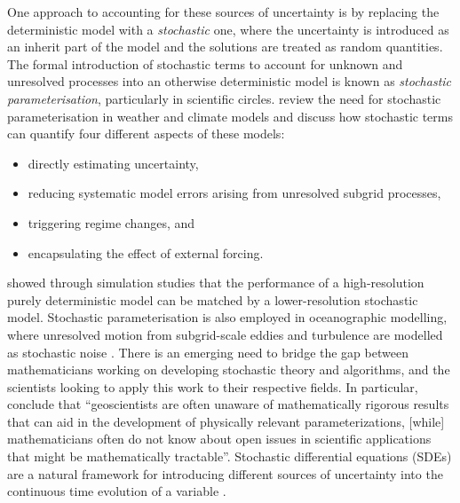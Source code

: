 One approach to accounting for these sources of uncertainty is by replacing the deterministic model with a \emph{stochastic} one, where the uncertainty is introduced as an inherit part of the model and the solutions are treated as random quantities.
The formal introduction of stochastic terms to account for unknown and unresolved processes into an otherwise deterministic model is known as \emph{stochastic parameterisation}, particularly in scientific circles.
\citet{BernerEtAl_2017_StochasticParameterizationNew} review the need for stochastic parameterisation in weather and climate models and discuss how stochastic terms can quantify four different aspects of these models:
\begin{itemize}
	\item directly estimating uncertainty,
	\item reducing systematic model errors arising from unresolved subgrid processes,
	\item triggering regime changes, and
	\item encapsulating the effect of external forcing.
\end{itemize}
\citet{DawsonPalmer_2015_SimulatingWeatherRegimes} showed through simulation studies that the performance of a high-resolution purely deterministic model can be matched by a lower-resolution stochastic model.
Stochastic parameterisation is also employed in oceanographic modelling, where unresolved motion from subgrid-scale eddies and turbulence are modelled as stochastic noise \citep{Griffa_1996_ApplicationsStochasticParticle,BerloffMcWilliams_2002_MaterialTransportOceanic}.
There is an emerging need to bridge the gap between mathematicians working on developing stochastic theory and algorithms, and the scientists looking to apply this work to their respective fields.
In particular, \citet{BernerEtAl_2017_StochasticParameterizationNew} conclude that ``geoscientists are often unaware of mathematically rigorous results that can aid in the development of physically relevant parameterizations, [while] mathematicians often do not know about open issues in scientific applications that might be mathematically tractable''.
Stochastic differential equations (SDEs) are a natural framework for introducing different sources of uncertainty into the continuous time evolution of a variable \citep{Oksendal_2003_StochasticDifferentialEquations,SarkkaSolin_2019_AppliedStochasticDifferential,KallianpurSundar_2014_StochasticAnalysisDiffusion}.
